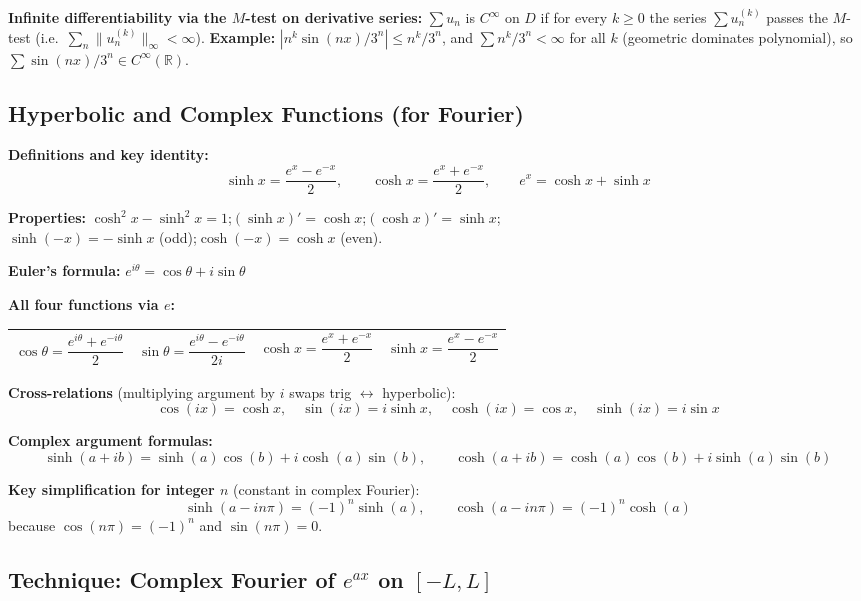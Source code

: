 \documentclass[12pt, a4paper]{article}
\theoremstyle{definition}
\theoremstyle{remark}
\begin{document}
\textbf{Infinite differentiability via the $M$-test on derivative series:}
$\sum u_n$ is $C^\infty$ on $D$ if for every $k\ge 0$ the series $\sum u_n^{(k)}$ passes the $M$-test
(i.e.\ $\sum_{n}\|u_n^{(k)}\|_\infty < \infty$).
\textbf{Example:} $|n^k\sin(nx)/3^n| \le n^k/3^n$, and $\sum n^k/3^n < \infty$ for all $k$ (geometric dominates polynomial),
so $\sum \sin(nx)/3^n \in C^\infty(\mathbb{R})$.

\subsection{Hyperbolic and Complex Functions (for Fourier)}

\textbf{Definitions and key identity:}
\[
  \sinh x = \frac{e^x - e^{-x}}{2}, \qquad \cosh x = \frac{e^x + e^{-x}}{2}, \qquad e^x = \cosh x + \sinh x
\]

\textbf{Properties:} $\cosh^2 x - \sinh^2 x = 1$;\quad $(\sinh x)' = \cosh x$;\quad $(\cosh x)' = \sinh x$;\\
$\sinh(-x) = -\sinh x$ (odd);\quad $\cosh(-x) = \cosh x$ (even).

\textbf{Euler's formula:} $e^{i\theta} = \cos\theta + i\sin\theta$

\textbf{All four functions via $e$:}
\begin{center}
\renewcommand{\arraystretch}{1.8}
\begin{tabular}{llll}
\toprule
$\cos\theta = \dfrac{e^{i\theta}+e^{-i\theta}}{2}$ &
$\sin\theta = \dfrac{e^{i\theta}-e^{-i\theta}}{2i}$ &
$\cosh x = \dfrac{e^{x}+e^{-x}}{2}$ &
$\sinh x = \dfrac{e^{x}-e^{-x}}{2}$ \\
\bottomrule
\end{tabular}
\end{center}

\textbf{Cross-relations} (multiplying argument by $i$ swaps trig $\leftrightarrow$ hyperbolic):
\[
  \cos(ix) = \cosh x, \quad \sin(ix) = i\sinh x, \quad \cosh(ix) = \cos x, \quad \sinh(ix) = i\sin x
\]

\textbf{Complex argument formulas:}
\[
  \sinh(a + ib) = \sinh(a)\cos(b) + i\cosh(a)\sin(b), \qquad
  \cosh(a + ib) = \cosh(a)\cos(b) + i\sinh(a)\sin(b)
\]

\textbf{Key simplification for integer $n$} (constant in complex Fourier):
\[
  \sinh(a - in\pi) = (-1)^n \sinh(a), \qquad \cosh(a - in\pi) = (-1)^n \cosh(a)
\]
because $\cos(n\pi) = (-1)^n$ and $\sin(n\pi) = 0$.

\subsection{Technique: Complex Fourier of $e^{ax}$ on $[-L,L]$}
\end{document}
